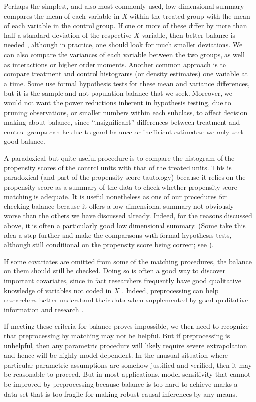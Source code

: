 \documentclass[11pt,titlepage]{article}
\begin{document}
Perhaps the simplest, and also most commonly used, low dimensional
summary compares the mean of each variable in $X$ within the treated
group with the mean of each variable in the control group.  If one or
more of these differ by more than half a standard deviation of the
respective $X$ variable, then better balance is needed
\citep{Cochran68}, although in practice, one should look for much
smaller deviations.  We can also compare the variances of each
variable between the two groups, as well as interactions or higher
order moments.  Another common approach is to compare treatment and
control histograms (or density estimates) one variable at a time.
Some use formal hypothesis tests for these mean and variance
differences, but it is the sample and not population balance that we
seek.  Moreover, we would not want the power reductions inherent in
hypothesis testing, due to pruning observations, or smaller numbers
within each subclass, to affect decision making about balance, since
``insignificant'' differences between treatment and control groups can
be due to good balance or inefficient estimates: we only seek good
balance.

A paradoxical but quite useful procedure is to compare the histogram
of the propensity scores of the control units with that of the treated
units. This is paradoxical (and part of the propensity score
tautology) because it relies on the propensity score as a summary of
the data to check whether propensity score matching is adequate.  It
is useful nonetheless as one of our procedures for checking balance
because it offers a low dimensional summary not obviously worse than
the others we have discussed already.  Indeed, for the reasons
discussed above, it is often a particularly good low dimensional
summary. (Some take this idea a step further and make the comparisons
with formal hypothesis tests, although still conditional on the
propensity score being correct; see \citealp{Sekhon04b}).

If some covariates are omitted from some of the matching procedures,
the balance on them should still be checked.  Doing so is often a good
way to discover important covariates, since in fact researchers
frequently have good qualitative knowledge of variables not coded in
$X$ \citep[][Ch.3]{Rosenbaum02}.  Indeed, preprocessing can help
researchers better understand their data when supplemented by good
qualitative information and research \citep[e.g.,][]{RosSil01}.

If meeting these criteria for balance proves impossible, we then need
to recognize that preprocessing by matching may not be helpful.  But
if preprocessing is unhelpful, then any parametric procedure will
likely require severe extrapolation and hence will be highly model
dependent.  In the unusual situation where particular parametric
assumptions are somehow justified and verified, then it may be
reasonable to proceed.  But in most applications, model sensitivity
that cannot be improved by preprocessing because balance is too hard
to achieve marks a data set that is too fragile for making robust
causal inferences by any means.
\end{document}
